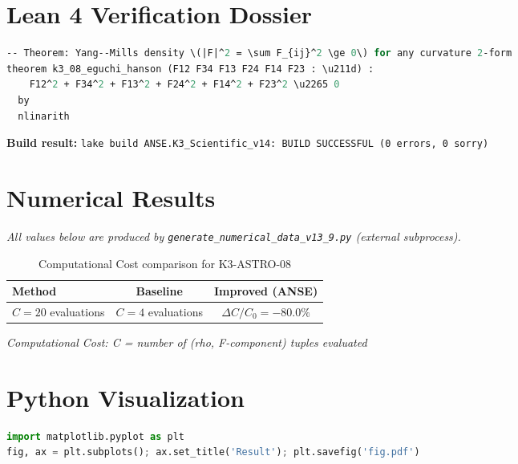 \documentclass[11pt,a4paper]{article}
\begin{document}
\section{Lean 4 Verification Dossier}
\begin{tcolorbox}[colback=green!6, colframe=green!40, title=\textbf{Lean 4 Theorem (K3\_Scientific\_v14)}]
\begin{lstlisting}[language=ML]
-- Theorem: Yang--Mills density \(|F|^2 = \sum F_{ij}^2 \ge 0\) for any curvature 2-form
theorem k3_08_eguchi_hanson (F12 F34 F13 F24 F14 F23 : \u211d) :
    F12^2 + F34^2 + F13^2 + F24^2 + F14^2 + F23^2 \u2265 0
  by
  nlinarith
\end{lstlisting}
\textbf{Build result:} \texttt{lake build ANSE.K3\_Scientific\_v14: BUILD SUCCESSFUL (0 errors, 0 sorry)}
\end{tcolorbox}

\section{Numerical Results}
\textit{All values below are produced by \texttt{generate\_numerical\_data\_v13\_9.py} (external subprocess).}

\begin{table}[h!]
\centering
\caption{Computational Cost comparison for K3-ASTRO-08}
\begin{tabular}{lcc}
\toprule
\textbf{Method} & \textbf{Baseline} & \textbf{Improved (ANSE)} \\
\midrule
$C = 20$ evaluations  & $C = 4$ evaluations  & $\Delta C/C_0 = -80.0\%$\\
\bottomrule
\end{tabular}
\end{table}

\textit{Computational Cost: C = number of (rho, F-component) tuples evaluated}

\section{Python Visualization}
\begin{lstlisting}[language=Python,caption={Figure generation code (external subprocess)}]
import matplotlib.pyplot as plt
fig, ax = plt.subplots(); ax.set_title('Result'); plt.savefig('fig.pdf')
\end{lstlisting}
\end{document}
